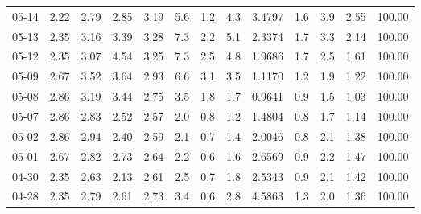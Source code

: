 \begin{threeparttable}
{\begin{tabular}{lrrrrrrrrrrrr}
  05-14 &          2.22 &          2.79 &          2.85 &        3.19 &                 5.6 &                 1.2 &        4.3 &       3.4797 &                 1.6 &              3.9 &            2.55 &                 100.00 \\
  05-13 &          2.35 &          3.16 &          3.39 &        3.28 &                 7.3 &                 2.2 &        5.1 &       2.3374 &                 1.7 &              3.3 &            2.14 &                 100.00 \\
  05-12 &          2.35 &          3.07 &          4.54 &        3.25 &                 7.3 &                 2.5 &        4.8 &       1.9686 &                 1.7 &              2.5 &            1.61 &                 100.00 \\
  05-09 &          2.67 &          3.52 &          3.64 &        2.93 &                 6.6 &                 3.1 &        3.5 &       1.1170 &                 1.2 &              1.9 &            1.22 &                 100.00 \\
  05-08 &          2.86 &          3.19 &          3.44 &        2.75 &                 3.5 &                 1.8 &        1.7 &       0.9641 &                 0.9 &              1.5 &            1.03 &                 100.00 \\
  05-07 &          2.86 &          2.83 &          2.52 &        2.57 &                 2.0 &                 0.8 &        1.2 &       1.4804 &                 0.8 &              1.7 &            1.14 &                 100.00 \\
  05-02 &          2.86 &          2.94 &          2.40 &        2.59 &                 2.1 &                 0.7 &        1.4 &       2.0046 &                 0.8 &              2.1 &            1.38 &                 100.00 \\
  05-01 &          2.67 &          2.82 &          2.73 &        2.64 &                 2.2 &                 0.6 &        1.6 &       2.6569 &                 0.9 &              2.2 &            1.47 &                 100.00 \\
  04-30 &          2.35 &          2.63 &          2.13 &        2.61 &                 2.5 &                 0.7 &        1.8 &       2.5343 &                 0.9 &              2.1 &            1.42 &                 100.00 \\
  04-28 &          2.35 &          2.79 &          2.61 &        2.73 &                 3.4 &                 0.6 &        2.8 &       4.5863 &                 1.3 &              2.0 &            1.36 &                 100.00 \\

\end{tabular}}
\end{threeparttable}
